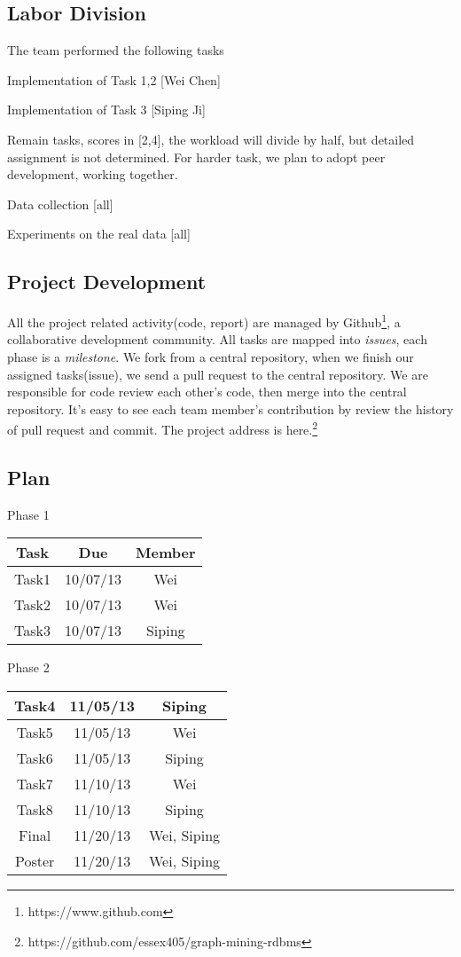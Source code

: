 \subsection{Labor Division}

The team performed the following tasks
\bit
\item Implementation of Task 1,2 [Wei Chen]
\item Implementation of Task 3 [Siping Ji]
\item Remain tasks, scores in [2,4], the workload will divide by half, but detailed assignment is not determined. For harder task, we plan to adopt peer development, working together. 
\item Data collection [all]
\item Experiments on the real data [all]
\eit

\subsection{Project Development}
All the project related activity(code, report) are managed by Github\footnote{https://www.github.com}, a collaborative development community. All tasks are mapped into \emph{issues}, each phase is a \emph{milestone}. We fork from a central repository, when we finish our assigned tasks(issue), we send a pull request to the central repository. We are responsible for code review each other's code, then merge into the central repository. It's easy to see each team member's contribution by review the history of pull request and commit. The project address is here.\footnote{https://github.com/essex405/graph-mining-rdbms}

\subsection{Plan}

\begin{center}
Phase 1\\
\begin{tabular}{|c|c|c|}
\hline
Task & Due & Member \\\hline
Task1 & 10/07/13 & Wei\\\hline
Task2 & 10/07/13 & Wei\\\hline
Task3 & 10/07/13 & Siping\\\hline
\end{tabular}
\end{center}

\begin{center}
Phase 2\\
\begin{tabular}{|c|c|c|}
\hline
Task4 & 11/05/13 & Siping\\\hline
Task5 & 11/05/13 & Wei\\\hline
Task6 & 11/05/13 & Siping\\\hline
Task7 & 11/10/13 & Wei\\\hline
Task8 & 11/10/13 & Siping\\\hline
Final & 11/20/13 & Wei, Siping\\\hline
Poster & 11/20/13 & Wei, Siping\\\hline
\end{tabular}
\end{center}

